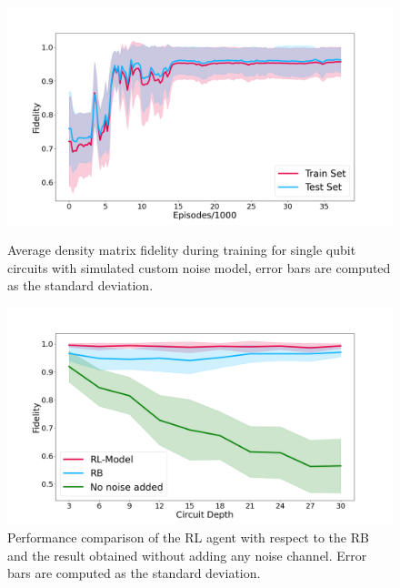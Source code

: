 \documentclass[referee,sn-basic]{sn-jnl} %
\begin{document}
\begin{figure}
    \centering
    \vspace{-8mm}
    \includegraphics[width=\textwidth]{1Q_train_results.png}
    \caption{Average density matrix fidelity during training for single qubit circuits with simulated custom noise model, error bars are computed as the standard deviation.}\label{fig_1q_sim_train}
    \includegraphics[width=\textwidth]{1Q_rb.png}
    \caption{Performance comparison of the RL agent with respect to the RB and the result obtained without adding any noise channel. Error bars are computed as the standard deviation.}\label{fig_1q_sim_bench}
\end{figure}
\end{document}
